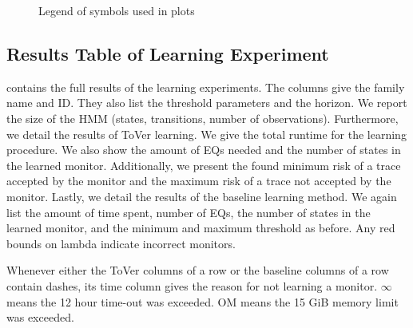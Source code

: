 \documentclass[runningheads]{llncs}
\newcommand{\alg}{ToVer\xspace}
\begin{document}
{\begin{figure}
    \centerline{
        \resizebox{.5\linewidth}{!}{
            }
    }
    \caption{Legend of symbols used in plots}
    \label{fig:legend}
\end{figure}

\subsection{Results Table of Learning Experiment}\label{app:learnrestable}
 contains the full results of the learning experiments. The columns give the family name and ID. They also list the threshold parameters and the horizon. We report the size of the HMM (states, transitions, number of observations). Furthermore, we detail the results of \alg learning. We give the total runtime for the learning procedure. We also show the amount of EQs needed and the number of states in the learned monitor. Additionally, we present the found minimum risk of a trace accepted by the monitor and the maximum risk of a trace not accepted by the monitor. Lastly, we detail the results of the baseline learning method. We again list the amount of time spent, number of EQs, the number of states in the learned monitor, and the minimum and maximum threshold as before. Any red bounds on lambda indicate incorrect monitors.

Whenever either the \alg columns of a row or the baseline columns of a row contain dashes, its time column gives the reason for not learning a monitor. $\infty$ means the 12 hour time-out was exceeded. OM means the 15 GiB memory limit was exceeded.

\begin{scriptsize}
    \setlength\LTleft{-.2cm}
    
\end{scriptsize}
}
\end{document}
